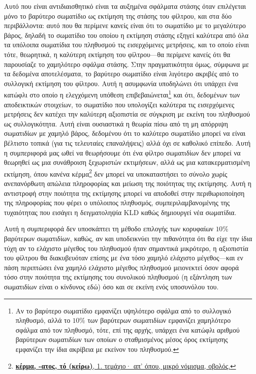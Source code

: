 Αυτό που είναι αντιδιαισθητικό είναι τα αυξημένα σφάλματα στάσης όταν
επιλέγεται μόνο το βαρύτερο σωματίδιο ως εκτίμηση της στάσης του φίλτρου, και
στα δύο περιβάλλοντα: αυτό που θα περίμενε κανείς είναι ότι το σωματίδιο με το
μεγαλύτερο βάρος, δηλαδή το σωματίδιο του οποίου η εκτίμηση στάσης εξηγεί
καλύτερα από όλα τα υπόλοιπα σωματίδια του πληθυσμού τις εισερχόμενες
μετρήσεις, και το οποίο είναι τότε, θεωρητικά, η καλύτερη εκτίμηση του
φίλτρου---θα περίμενε κανείς ότι θα παρουσίαζε το χαμηλότερο σφάλμα στάσης.
Στην πραγματικότητα όμως, σύμφωνα με τα δεδομένα αποτελέσματα, το βαρύτερο
σωματίδιο είναι λιγότερο ακριβές από το συλλογική εκτίμηση του φίλτρου. Αυτή η
ασυμφωνία υποδηλώνει ότι υπάρχει ένα κατώφλι στο οποίο η ελεγχόμενη υπόθεση
επιβεβαιώνεται\footnote{Αν το βαρύτερο σωματίδιο εμφανίζει υψηλότερο σφάλμα από
το συλλογικό πληθυσμό, αλλά το $10\%$ των βαρύτερων σωματιδίων εμφανίζει
χαμηλότερο σφάλμα από τον πληθυσμό, τότε, επί της αρχής, υπάρχει ένα κατώφλι
αριθμού βαρύτερων σωματιδίων των οποίων ο σταθμισμένος μέσος όρος εκτίμησης
εμφανίζει την ίδια ακρίβεια με εκείνον του πληθυσμού.} και ότι, δεδομένων των
αποδεικτικών στοιχείων, το σωματίδιο που υπολογίζει καλύτερα τις εισερχόμενες
μετρήσεις δεν κατέχει την καλύτερη αξιοπιστία σε σύγκριση με εκείνη του
πληθυσμού ως συλλογικότητα. Αυτή είναι ουσιαστικά η θεωρία πίσω από τη μη
απόρριψη σωματιδίων με χαμηλό βάρος, δεδομένου ότι το καλύτερο σωματίδιο μπορεί
να είναι βέλτιστο τοπικά (για τις τελευταίες επαναλήψεις) αλλά όχι σε καθολικό
επίπεδο. Αυτή η συμπεριφορά μας ωθεί να θεωρήσουμε ότι ένα φίλτρο σωματιδίων
δεν μπορεί να θεωρηθεί ως μια συνάθροιση ξεχωριστών εκτιμήσεων, αλλά ως μια
κατακερματισμένη εκτίμηση, όπου κανένα
κέρμα\footnote{\href{https://www.greek-language.gr/digitalResources/ancient_greek/tools/liddell-scott/search.html?lq=\%CE\%BA\%CE\%AD\%CF\%81\%CE\%BC\%CE\%B1}
{\textbf{κέρμα, -ατος, τό (κείρω)}, 1.
τεμάχιο· απ' όπου, μικρό νόμισμα, οβολός.}} δεν μπορεί να υποκαταστήσει το
σύνολο χωρίς ανεπανόρθωτη απώλεια πληροφορίας και μείωση της ποιότητας της
εκτίμησης. Αυτή η αντιστροφή στην ποιότητα της εκτίμησης μπορεί να αποδοθεί
στην περιθωριοποίηση της πληροφορίας που φέρει ο υπόλοιπος πληθυσμός,
συμπεριλαμβανομένης της τυχαιότητας που εισάγει η δειγματοληψία KLD καθώς
δημιουργεί νέα σωματίδια.

Αυτή η συμπεριφορά δεν υποσκάπτει τη μέθοδο επιλογής των κορυφαίων $10\%$
βαρύτερων σωματιδίων, καθώς, αν και υποδεικνύει την πιθανότητα ότι θα είχε την
ίδια τύχη αν το ελάχιστο μέγεθος του πληθυσμού ήταν σημαντικά μικρότερο, η
αξιοπιστία του φίλτρου θα διακυβευόταν επίσης με ένα τόσο χαμηλό ελάχιστο
μέγεθος---και εν πάση περιπτώσει ένα χαμηλό ελάχιστο μέγεθος πληθυσμού
μειονεκτεί όσον αφορά τόσο στην ποιότητα της εκτίμησης του συνολικού πληθυσμού
(η εξάντληση των σωματιδίων είναι ο κίνδυνος εδώ) όσο και σε εκείνη ενός
υποσυνόλου του.



